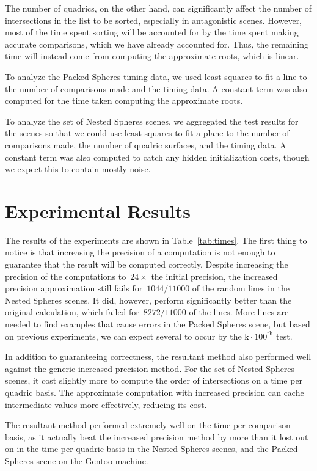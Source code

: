 \documentclass{cccg16}
\begin{document}
The number of quadrics, on the other hand, can significantly affect
the number of intersections in the list to be sorted, especially in
antagonistic scenes.  However, most of the time spent sorting will be
accounted for by the time spent making accurate comparisons, which we
have already accounted for.  Thus, the remaining time will instead
come from computing the approximate roots, which is linear.

To analyze the Packed Spheres timing data, we used least squares to
fit a line to the number of comparisons made and the timing data.  A
constant term was also computed for the time taken computing the
approximate roots.

To analyze the set of Nested Spheres scenes, we aggregated the test
results for the scenes so that we could use least squares to fit a
plane to the number of comparisons made, the number of quadric
surfaces, and the timing data.  A constant term was also computed to
catch any hidden initialization costs, though we expect this to
contain mostly noise.

\section{Experimental Results}
The results of the experiments are shown in Table~\ref{tab:times}.
The first thing to notice is that increasing the precision of a
computation is not enough to guarantee that the result will be
computed correctly.  Despite increasing the precision of the
computations to~$24\times$ the initial precision, the increased
precision approximation still fails for~$1044/11000$ of the random
lines in the Nested Spheres scenes.  It did, however, perform
significantly better than the original calculation, which failed
for~$8272/11000$ of the lines.  More lines are needed to find examples
that cause errors in the Packed Spheres scene, but based on previous
experiments, we can expect several to occur by the
$\text{k} \cdot 100^\text{th}$ test.

In addition to guaranteeing correctness, the resultant method also
performed well against the generic increased precision method.  For
the set of Nested Spheres scenes, it cost slightly more to compute the
order of intersections on a time per quadric basis.  The approximate
computation with increased precision can cache intermediate values
more effectively, reducing its cost.

The resultant method  performed extremely well on the time per
comparison basis, as it actually beat the increased precision method
by more than it lost out on in the time per quadric basis in the
Nested Spheres scenes, and the Packed Spheres scene on the Gentoo
machine.
\end{document}
